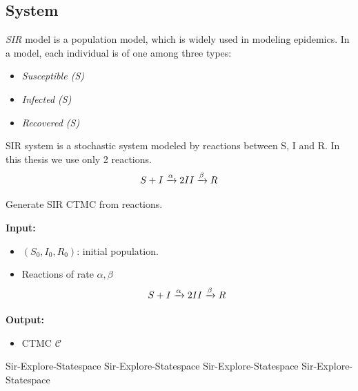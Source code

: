 \subsection{System}
\textit{SIR} model  is a population model, which is widely used in
modeling epidemics. In a  model, each individual is of one
among three types:
\begin{itemize}
    \item \textit{Susceptible (S)}
    \item \textit{Infected (S)}
    \item \textit{Recovered (S)}
\end{itemize}
SIR system is a stochastic system modeled by reactions between S, I and R. In this thesis we use only 2 reactions.
\begin{equation*}
    S + I \xrightarrow{\alpha} 2I \\
    I \xrightarrow{\beta} R
    \label{eqn:sir}
\end{equation*}

\begin{algorithm}[H]
    \caption{Generate SIR CTMC from reactions.}
    \label{alg:gen-sir-ctmc}
    \hspace*{\algorithmicindent} \textbf{Input:}
    \begin{itemize}
        \item $(S_0, I_0, R_0)$: initial population.
        \item Reactions of rate $\alpha,\beta$
              \begin{equation*}
                  S + I \xrightarrow{\alpha} 2I \\
                  I \xrightarrow{\beta} R
              \end{equation*}
    \end{itemize}
    \hspace*{\algorithmicindent} \textbf{Output:}
    \begin{itemize}
        \item CTMC $\mathcal{C}$
    \end{itemize}
    \begin{algorithmic}[1]
        \EndIf
        \State Sir-Explore-Statespace
        \EndIf
        \State Sir-Explore-Statespace
        \EndIf
        \EndProcedure
        \EndIf
        \State Sir-Explore-Statespace
        \EndIf
        \State Sir-Explore-Statespace
        \EndIf
        \EndProcedure
    \end{algorithmic}

\end{algorithm}

